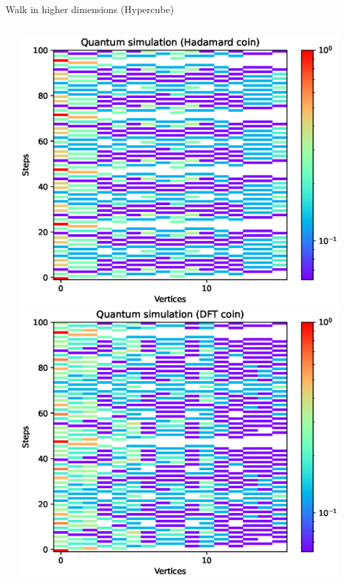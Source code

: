 \documentclass[aspectratio=169]{beamer}
\begin{document}
\begin{frame}{Walk in higher dimensions (Hypercube)}
\begin{columns}[onlytextwidth]
\begin{column}{.30\textwidth}
    \end{column}
    \begin{column}{.30\textwidth}
      \includegraphics[width=\textwidth]{./figures/results/hypercube/hadamard.eps}
      \vspace{-1em} %
      \includegraphics[width=\textwidth]{./figures/results/hypercube/dft.eps}
    \end{column}
    \begin{column}{.20\textwidth}
    \end{column}
  \end{columns}
\end{frame}
\end{document}
